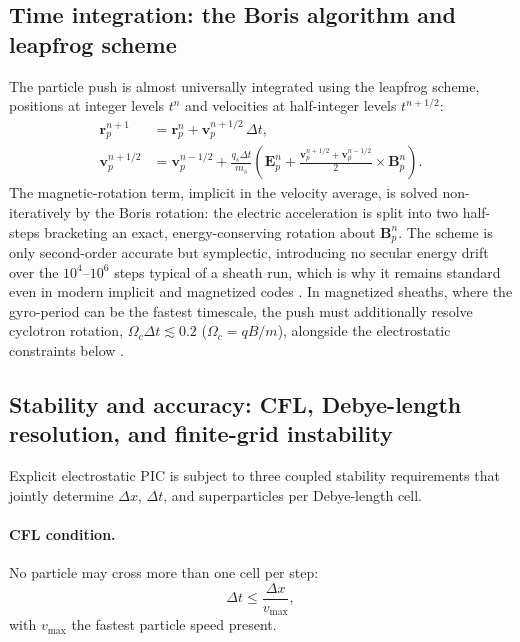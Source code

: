 \subsection{Time integration: the Boris algorithm and leapfrog scheme}

The particle push is almost universally integrated using the leapfrog scheme, positions at integer levels $t^{n}$ and velocities at half-integer levels $t^{n+1/2}$:
\begin{align}
\mathbf{r}_{p}^{n+1} &= \mathbf{r}_{p}^{n} + \mathbf{v}_{p}^{n+1/2}\,\Delta t, \\
\mathbf{v}_{p}^{n+1/2} &= \mathbf{v}_{p}^{n-1/2} + \frac{q_{s}\Delta t}{m_{s}}\left(\mathbf{E}_{p}^{n} + \frac{\mathbf{v}_{p}^{n+1/2}+\mathbf{v}_{p}^{n-1/2}}{2}\times\mathbf{B}_{p}^{n}\right).
\end{align}
The magnetic-rotation term, implicit in the velocity average, is solved non-iteratively by the Boris rotation: the electric acceleration is split into two half-steps bracketing an exact, energy-conserving rotation about $\mathbf{B}_{p}^{n}$. The scheme is only second-order accurate but symplectic, introducing no secular energy drift over the $10^{4}$--$10^{6}$ steps typical of a sheath run, which is why it remains standard even in modern implicit and magnetized codes \cite{ref0637}. In magnetized sheaths, where the gyro-period can be the fastest timescale, the push must additionally resolve cyclotron rotation, $\Omega_{c}\Delta t \lesssim 0.2$ ($\Omega_{c}=qB/m$), alongside the electrostatic constraints below \cite{ref0633,ref0637}.

\subsection{Stability and accuracy: CFL, Debye-length resolution, and finite-grid instability}

Explicit electrostatic PIC is subject to three coupled stability requirements that jointly determine $\Delta x$, $\Delta t$, and superparticles per Debye-length cell.

\paragraph{CFL condition.} No particle may cross more than one cell per step:
\begin{equation}
\Delta t \le \frac{\Delta x}{v_{\max}},
\end{equation}
with $v_{\max}$ the fastest particle speed present.

